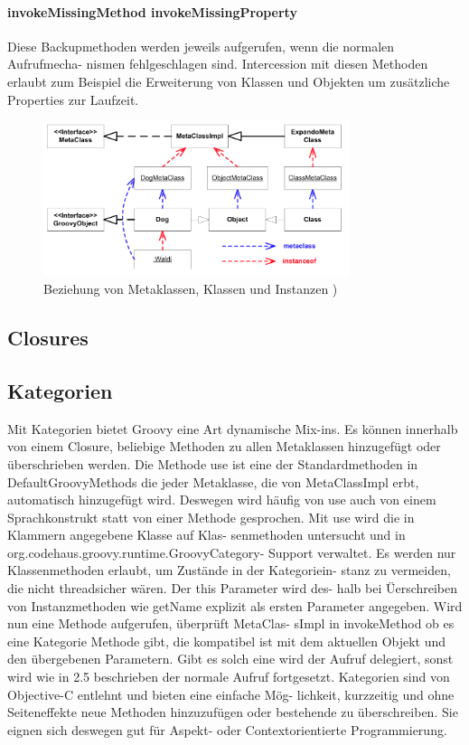 \documentclass[11pt,english,ngerman, headsepline]{scrreprt}
\begin{document}
\paragraph{ invokeMissingMethod invokeMissingProperty}
Diese Backupmethoden werden jeweils aufgerufen, wenn die normalen Aufrufmecha-
nismen fehlgeschlagen sind. Intercession mit diesen Methoden erlaubt zum
Beispiel die Erweiterung von Klassen und Objekten um zusätzliche Properties zur
Laufzeit.
 \cite{mpInGroovy}


\begin{figure}[h!]
	\begin{center}
	\includegraphics[width=0.8\textwidth]{pics/groovyMetaklassen}
	\end{center}
	\caption{Beziehung von Metaklassen, Klassen und Instanzen \cite{mpInGroovy})}
	\label{groovyMetaclassDiagram}
\end{figure}




\subsection{Closures} 


\subsection{Kategorien}
Mit Kategorien bietet Groovy eine Art dynamische Mix-ins. Es können innerhalb
von einem Closure, beliebige Methoden zu allen Metaklassen hinzugefügt oder
überschrieben werden.
Die Methode use ist eine der Standardmethoden in DefaultGroovyMethods die jeder
Metaklasse, die von MetaClassImpl erbt, automatisch hinzugefügt wird. Deswegen
wird häufig von use auch von einem Sprachkonstrukt statt von einer Methode
gesprochen. Mit use wird die in Klammern angegebene Klasse auf Klas- senmethoden
untersucht und in org.codehaus.groovy.runtime.GroovyCategory- Support verwaltet.
Es werden nur Klassenmethoden erlaubt, um Zustände in der Kategoriein- stanz zu
vermeiden, die nicht threadsicher wären. Der this Parameter wird des- halb bei
Üerschreiben von Instanzmethoden wie getName explizit als ersten Parameter
angegeben. Wird nun eine Methode aufgerufen, überprüft MetaClas- sImpl in
invokeMethod ob es eine Kategorie Methode gibt, die kompatibel ist mit dem
aktuellen Objekt und den übergebenen Parametern. Gibt es solch eine wird der
Aufruf delegiert, sonst wird wie in 2.5 beschrieben der normale Aufruf
fortgesetzt.
Kategorien sind von Objective-C entlehnt und bieten eine einfache Mög-
lichkeit, kurzzeitig und ohne Seiteneffekte neue Methoden hinzuzufügen oder
bestehende zu überschreiben. Sie eignen sich deswegen gut für Aspekt- oder
Contextorientierte Programmierung. \cite{mpInGroovy}
\end{document}
